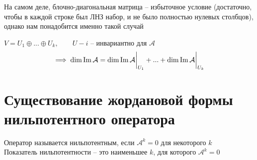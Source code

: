 \begin{remark}
	На самом деле, блочно-диагональная матрица -- избыточное условие (достаточно, чтобы в каждой строке был ЛНЗ набор, и не было полностью нулевых столбцов), однако нам понадобится именно такой случай
\end{remark}

\begin{implication}
	$ V = U_1 \oplus ... \oplus U_k, \qquad U-i $ -- инвариантно для $ \mathcal{A} $
	$$ \implies \dim \operatorname{Im} \mathcal{A} = \dim \operatorname{Im} \mathcal{A}\bigg|_{U_1}^{} + ... + \dim \operatorname{Im} \mathcal{A}\bigg|_{U_k}^{} $$
\end{implication}

\section{Существование жордановой формы нильпотентного оператора}

\begin{definition}
	Оператор называется нильпотентным, если $ \mathcal{A}^k = 0 $ для некоторого $ k $ \\
	Показатель нильпотентности -- это наименьшее $ k $, для которого $ \mathcal{A}^k = 0 $
\end{definition}

